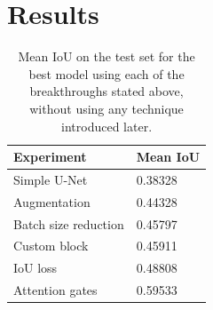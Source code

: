 \documentclass[11pt]{article}
\begin{document}
\begin{multicols}{2}


      \label{sec:results}
      \section{Results}

      \begin{table}[H]
            \centering
            \setlength{\tabcolsep}{3pt}
            \caption{Mean IoU on the test set for the best model using each of the breakthroughs stated above, without using any technique introduced later.}
            \begin{tabularx}{\linewidth}{lY}
                \toprule
                Experiment & Mean IoU \\
                \midrule
                Simple U-Net & 0.38328 \\
                Augmentation & 0.44328 \\
                Batch size reduction & 0.45797 \\
                Custom block & 0.45911 \\
                IoU loss & 0.48808 \\
                Attention gates & 0.59533 \\
                \bottomrule
            \end{tabularx}
            \label{tab:results}
        \end{table}


\end{multicols}
\end{document}
